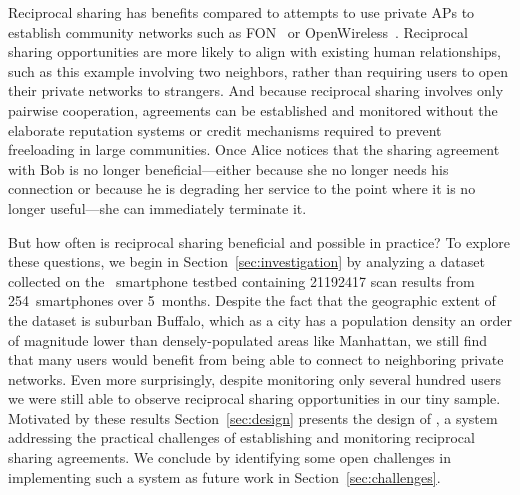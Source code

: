 Reciprocal \wifi{} sharing has benefits compared to attempts to use private
APs to establish community networks such as FON~\cite{fon} or
OpenWireless~\cite{openwireless}. Reciprocal \wifi{} sharing opportunities
are more likely to align with existing human relationships, such as this
example involving two neighbors, rather than requiring users to open their
private networks to strangers. And because reciprocal \wifi{} sharing
involves only pairwise cooperation, agreements can be established and
monitored without the elaborate reputation systems or credit mechanisms
required to prevent freeloading in large communities. Once Alice notices that
the sharing agreement with Bob is no longer beneficial---either because she
no longer needs his connection or because he is degrading her service to the
point where it is no longer useful---she can immediately terminate it.

But how often is reciprocal \wifi{} sharing beneficial and possible in
practice? To explore these questions, we begin in
Section~\ref{sec:investigation} by analyzing a dataset collected on the
\PhoneLab{}~smartphone testbed containing \num{21192417} \wifi{} scan results
from 254~smartphones over 5~months. Despite the
fact that the geographic extent of the dataset is suburban Buffalo, which as
a city has a population density an order of magnitude lower than
densely-populated areas like Manhattan, we still find that many users would
benefit from being able to connect to neighboring private networks. Even more
surprisingly, despite monitoring only several hundred users we were still
able to observe reciprocal \wifi{} sharing opportunities in our tiny
sample. Motivated by these results Section~\ref{sec:design} presents the
design of \wisefi{}, a system addressing the practical challenges of
establishing and monitoring reciprocal \wifi{} sharing agreements. We
conclude by identifying some open challenges in implementing such a system as
future work in Section~\ref{sec:challenges}.
